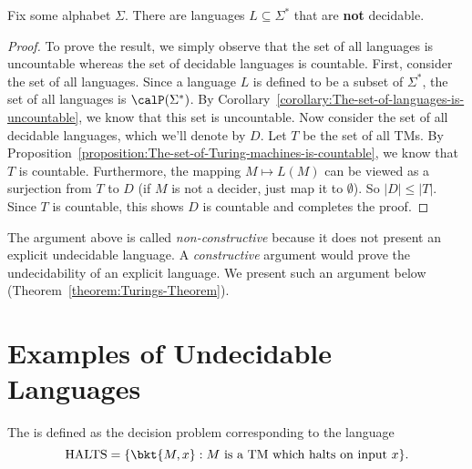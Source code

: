 \begin{flex}
\begin{theorem} \label{theorem:Almost-all-languages-are-undecidable}
Fix some alphabet $\Sigma$. There are languages $L \subseteq \Sigma^*$ that are \textbf{not} decidable.
\end{theorem}

\begin{proof}
To prove the result, we simply observe that the set of all languages is uncountable whereas the set of decidable languages is countable. First, consider the set of all languages. Since a language $L$ is defined to be a subset of $\Sigma^*$, the set of all languages is $\calP(\Sigma^*)$. By Corollary~\ref{corollary:The-set-of-languages-is-uncountable}, we know that this set is uncountable. Now consider the set of all decidable languages, which we'll denote by $D$. Let $T$ be the set of all TMs. By Proposition~\ref{proposition:The-set-of-Turing-machines-is-countable}, we know that $T$ is countable. Furthermore, the mapping $M \mapsto L(M)$ can be viewed as a surjection from $T$ to $D$ (if $M$ is not a decider, just map it to $\emptyset$). So $|D| \leq |T|$. Since $T$ is countable, this shows $D$ is countable and completes the proof.
\end{proof}
\end{flex}


\begin{note} \label{note:Constructive-vs-non-constructive-proofs}
The argument above is called \emph{non-constructive} because it does not present an explicit undecidable language. A \emph{constructive} argument would prove the undecidability of an explicit language. We present such an argument below (Theorem~\ref{theorem:Turings-Theorem}). 
\end{note}






\section{Examples of Undecidable Languages}


\begin{definition} \label{definition:Halting-problem} 
The  is defined as the decision problem corresponding to the language
$$
\text{HALTS} = \{\bkt{M,x} : \text{$M$ is a TM which halts on input $x$} \}.
$$
\end{definition}


